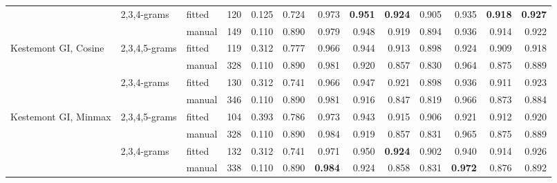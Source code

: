 \documentclass[
    hf
]{ceurart}
\begin{document}
\begin{table}
\begin{adjustbox}{max width=\textwidth}
\begin{tabular}{lllrrrrrrrrrr}
                                                      & \multirow[c]{2}{*}{ 2,3,4-grams }   & fitted  & 120       & 0.125   & 0.724  & 0.973          & \textbf{0.951} & \textbf{0.924} & 0.905          & 0.935          & \textbf{0.918} & \textbf{0.927} \\
                                                      &                                     & manual  & 149       & 0.110   & 0.890  & 0.979          & 0.948          & 0.919          & 0.894          & 0.936          & 0.914          & 0.922          \\
            \multirow[c]{4}{*}{Kestemont GI, Cosine } & \multirow[c]{2}{*}{ 2,3,4,5-grams } & fitted  & 119       & 0.312   & 0.777  & 0.966          & 0.944          & 0.913          & 0.898          & 0.924          & 0.909          & 0.918          \\
                                                      &                                     & manual  & 328       & 0.110   & 0.890  & 0.981          & 0.920          & 0.857          & 0.830          & 0.964          & 0.875          & 0.889          \\
                                                      & \multirow[c]{2}{*}{ 2,3,4-grams }   & fitted  & 130       & 0.312   & 0.741  & 0.966          & 0.947          & 0.921          & 0.898          & 0.936          & 0.911          & 0.923          \\
                                                      &                                     & manual  & 346       & 0.110   & 0.890  & 0.981          & 0.916          & 0.847          & 0.819          & 0.966          & 0.873          & 0.884          \\
            \multirow[c]{4}{*}{Kestemont GI, Minmax } & \multirow[c]{2}{*}{ 2,3,4,5-grams } & fitted  & 104       & 0.393   & 0.786  & 0.973          & 0.943          & 0.915          & 0.906          & 0.921          & 0.912          & 0.920          \\
                                                      &                                     & manual  & 328       & 0.110   & 0.890  & 0.984          & 0.919          & 0.857          & 0.831          & 0.965          & 0.875          & 0.889          \\
                                                      & \multirow[c]{2}{*}{ 2,3,4-grams }   & fitted  & 132       & 0.312   & 0.741  & 0.971          & 0.950          & \textbf{0.924} & 0.902          & 0.940          & 0.914          & 0.926          \\
                                                      &                                     & manual  & 338       & 0.110   & 0.890  & \textbf{0.984} & 0.924          & 0.858          & 0.831          & \textbf{0.972} & 0.876          & 0.892          \\
            \bottomrule
        \end{tabular}
    \end{adjustbox}
\end{table}
\end{document}
